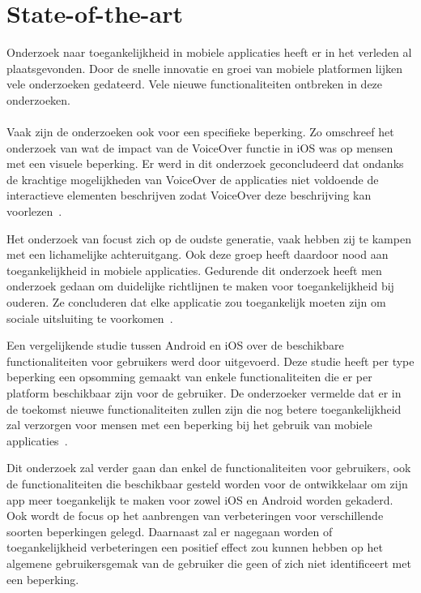 
\section{State-of-the-art}
\label{sec:state-of-the-art}

Onderzoek naar toegankelijkheid in mobiele applicaties heeft er in het verleden al plaatsgevonden. Door de snelle innovatie en groei van mobiele platformen lijken vele onderzoeken gedateerd. Vele nieuwe functionaliteiten ontbreken in deze onderzoeken.
\\~\\
Vaak zijn de onderzoeken ook voor een specifieke beperking. Zo omschreef het onderzoek van \citeauthor{leporini2012interacting} wat de impact van de VoiceOver functie in iOS was op mensen met een visuele beperking. Er werd in dit onderzoek geconcludeerd dat ondanks de krachtige mogelijkheden van VoiceOver de applicaties niet voldoende de interactieve elementen beschrijven zodat VoiceOver deze beschrijving kan voorlezen~\autocite{leporini2012interacting}. 

Het onderzoek van \citeauthor{diaz2014accessibility} focust zich op de oudste generatie, vaak hebben zij te kampen met een lichamelijke achteruitgang. Ook deze groep heeft daardoor nood aan toegankelijkheid in mobiele applicaties. Gedurende dit onderzoek heeft men onderzoek gedaan om duidelijke richtlijnen te maken voor toegankelijkheid bij ouderen. Ze concluderen dat elke applicatie zou toegankelijk moeten zijn om sociale uitsluiting te voorkomen~\autocite{diaz2014accessibility}. 

Een vergelijkende studie tussen Android en iOS over de beschikbare functionaliteiten voor gebruikers werd door \citeauthor{10.1007/978-3-319-07638-6_14} uitgevoerd. Deze studie heeft per type beperking een opsomming gemaakt van enkele functionaliteiten die er per platform beschikbaar zijn voor de gebruiker. De onderzoeker vermelde dat er in de toekomst nieuwe functionaliteiten zullen zijn die nog betere toegankelijkheid zal verzorgen voor mensen met een beperking bij het gebruik van mobiele applicaties~\autocite{10.1007/978-3-319-07638-6_14}. 

Dit onderzoek zal verder gaan dan enkel de functionaliteiten voor gebruikers, ook de functionaliteiten die beschikbaar gesteld worden voor de ontwikkelaar om zijn app meer toegankelijk te maken voor zowel iOS en Android worden gekaderd. Ook wordt de focus op het aanbrengen van verbeteringen voor verschillende soorten beperkingen gelegd. Daarnaast zal er nagegaan worden of toegankelijkheid verbeteringen een positief effect zou kunnen hebben op het algemene gebruikersgemak van de gebruiker die geen of zich niet identificeert met een beperking.


